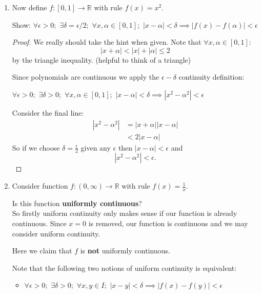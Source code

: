 \begin{enumerate}
    \item Now define $f:[0, 1]\rightarrow\mathbb{R}$ with rule $f(x)=x^2$.

    Show: $\forall\epsilon>0;$ $\exists\delta=\epsilon/2;$
    $\forall x, \alpha \in [0, 1];$
    $|x-\alpha|<\delta \implies |f(x)-f(\alpha)|<\epsilon$ \\

    \begin{proof}
        We really should take the hint when given. Note that $\forall x, \alpha \in [0,1]$:
        $$|x+\alpha|<|x|+|\alpha|\leq2$$
        by the triangle inequality. (helpful to think of a triangle)
        
        Since polynomials are continuous we apply the $\epsilon-\delta$ continuity definition:
        
        $\forall\epsilon>0;$ $\exists\delta>0;$
        $\forall x, \alpha \in [0, 1];$
        $|x-\alpha|<\delta \implies |x^2-\alpha^2|<\epsilon$
    
        Consider the final line:
        \begin{align*}
            |x^2-\alpha^2| &= |x+\alpha||x-\alpha| \\
            &<2|x-\alpha|
        \end{align*}
        So if we choose $\delta=\frac{\epsilon}{2}$ given any $\epsilon$ then $|x-\alpha|<\epsilon$ and
        $$|x^2-\alpha^2|<\epsilon.$$
    \end{proof}

    \newpage

    \item Consider function $f:(0,\infty)\rightarrow\mathbb{R}$ with rule $f(x)=\frac{1}{x}$.
    
    Is this function \textbf{uniformly continuous}? \\

    So firstly uniform continuity only makes sense if our function is already continuous. Since $x=0$ is removed, our function is continuous and we may consider uniform continuity.

    Here we claim that $f$ is \textbf{not} uniformly continuous.

    Note that the following two notions of uniform continuity is equivalent:
    \begin{itemize}
        \item $\forall\epsilon>0;$ $\exists\delta>0;$
        $\forall x, y \in I;$
        $|x-y|<\delta \implies |f(x)-f(y)|<\epsilon$


\end{itemize}
\end{enumerate}
